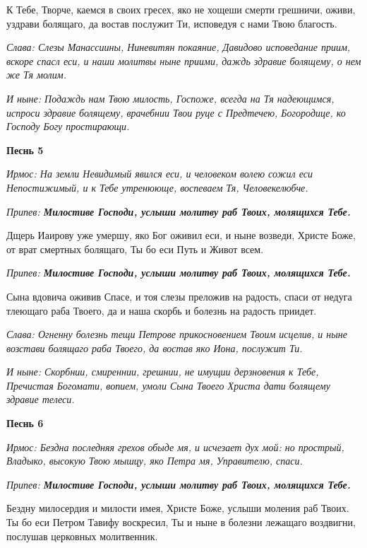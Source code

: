 \normalfont{}К Тебе, Творче, каемся в своих гресех, яко не хощеши смерти грешничи, оживи, уздрави болящаго, да востав послужит Ти, исповедуя с нами Твою благость.

\itshape Слава: \normalfont{}Слезы Манассиины, Ниневитян покаяние, Давидово исповедание приим, вскоре спасл еси, и наши молитвы ныне приими, даждь здравие болящему, о нем же Тя молим.

\itshape И ныне: \normalfont{}Подаждь нам Твою милость, Госпоже, всегда на Тя надеющимся, испроси здравие болящему, врачебнии Твои руце с Предтечею, Богородице, ко Господу Богу простирающи.


\medskip


\bfseries Песнь 5\normalfont{}


\itshape Ирмос: \normalfont{}На земли Невидимый явился еси, и человеком волею сожил еси Непостижимый, и к Тебе утренююще, воспеваем Тя, Человекелюбче.

\itshape Припев: \normalfont{}\bfseries Милостиве Господи, услыши молитву раб Твоих, молящихся Тебе.

\normalfont{}Дщерь Иаирову уже умершу, яко Бог оживил еси, и ныне возведи, Христе Боже, от врат смертных болящаго, Ты бо еси Путь и Живот всем.

\itshape Припев: \normalfont{}\bfseries Милостиве Господи, услыши молитву раб Твоих, молящихся Тебе.

\normalfont{}Сына вдовича оживив Спасе, и тоя слезы преложив на радость, спаси от недуга тлеющаго раба Твоего, да и наша скорбь и болезнь на радость приидет.

\itshape Слава: \normalfont{}Огненну болезнь тещи Петрове прикосновением Твоим исцелив, и ныне возстави болящаго раба Твоего, да востав яко Иона, послужит Ти.

\itshape И ныне: \normalfont{}Скорбнии, смиреннии, грешнии, не имущии дерзновения к Тебе, Пречистая Богомати, вопием, умоли Сына Твоего Христа дати болящему здравие телеси.


\medskip


\bfseries Песнь 6\normalfont{}


\itshape Ирмос: \normalfont{}Бездна последняя грехов обыде мя, и исчезает дух мой: но прострый, Владыко, высокую Твою мышцу, яко Петра мя, Управителю, спаси.

\itshape Припев: \normalfont{}\bfseries Милостиве Господи, услыши молитву раб Твоих, молящихся Тебе.

\normalfont{}Бездну милосердия и милости имея, Христе Боже, услыши моления раб Твоих. Ты бо еси Петром Тавифу воскресил, Ты и ныне в болезни лежащаго воздвигни, послушав церковных молитвенник.

